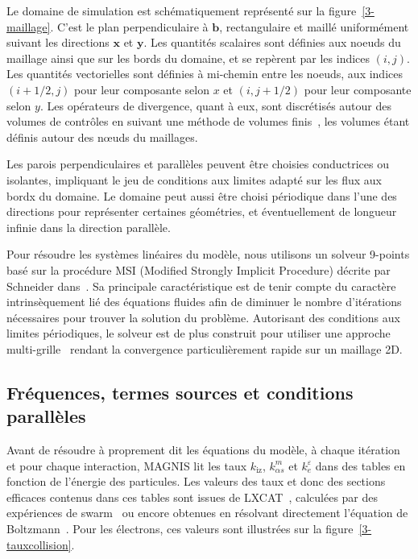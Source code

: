 \begin{refsection}
Le domaine de simulation est schématiquement représenté sur la figure~\ref{3-maillage}.
C'est le plan perpendiculaire à $\mathbf{b}$, rectangulaire et maillé uniformément suivant
les directions $\mathbf{x}$ et $\mathbf{y}$. Les quantités
scalaires sont définies aux noeuds du maillage ainsi que sur les bords du
domaine, et se repèrent par les indices $(i,j)$. Les quantités vectorielles
sont définies à mi-chemin entre les noeuds, aux indices $(i+1/2,j)$ pour leur
composante selon $x$ et $(i,j+1/2)$ pour leur composante selon $y$.
Les opérateurs
de divergence, quant à eux, sont discrétisés autour des volumes de contrôles en
suivant une méthode de volumes finis~\parencite{toro}, les volumes étant définis autour des n\oe uds du
maillages. 

Les parois perpendiculaires et parallèles peuvent être choisies conductrices ou
isolantes, impliquant le jeu de conditions aux limites adapté sur les flux
aux bordx du domaine. Le domaine peut aussi être choisi périodique dans l'une
des directions pour représenter certaines géométries, et éventuellement
de longueur infinie dans la direction parallèle.
 
Pour résoudre les systèmes linéaires du modèle, nous utilisons un solveur
9-points basé sur la procédure
MSI (Modified Strongly Implicit Procedure) décrite par Schneider
dans~\parencite{Schneider}. Sa principale caractéristique est de tenir
compte du caractère intrinsèquement lié des équations fluides afin de diminuer
le nombre d'itérations nécessaires pour trouver la solution du problème. Autorisant des
conditions aux limites périodiques, le solveur est de plus construit pour
utiliser une approche multi-grille~\parencite{Fedorenko} rendant la convergence
particulièrement rapide sur un maillage 2D.

\subsection{Fréquences, termes sources et conditions parallèles}
Avant de résoudre à proprement dit les équations du modèle, à chaque
itération et pour chaque interaction, MAGNIS lit les taux $k_\text{iz}$,
$k^m_{\alpha s}$ et $k^\varepsilon_{e}$ dans des tables en fonction
de l'énergie des particules. 
Les valeurs des taux et donc des sections efficaces contenus dans ces tables
sont issues de LXCAT~\parencite{LXCAT}, calculées par des expériences de
swarm~\parencite{Phelps} ou encore obtenues en résolvant directement l'équation
de Boltzmann~\parencite{Bolsig}. Pour les électrons, ces valeurs sont illustrées
sur la figure~\ref{3-tauxcollision}.


\end{refsection}
